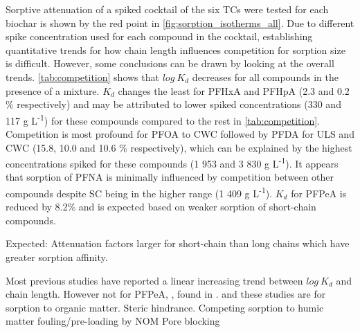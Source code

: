 Sorptive attenuation of a spiked cocktail of the six TCs were tested for each biochar is shown by the red point in \cref{fig:sorption_isotherms_all}. Due to different spike concentration used for each compound in the cocktail, establishing quantitative trends for how chain length influences competition for sorption size is difficult. However, some conclusions can be drawn by looking at the overall trends. \cref{tab:competition} shows that $log~K_d$ decreases for all compounds in the presence of a mixture. $K_d$ changes the least for PFHxA and PFHpA (2.3 and 0.2 \% respectively) and may be attributed to lower spiked concentrations (330 and 117 \textmu g L\textsuperscript{-1}) for these compounds compared to the rest in \cref{tab:competition}. Competition is most profound for PFOA to CWC followed by PFDA for ULS and CWC (15.8, 10.0 and 10.6 \% respectively), which can be explained by the highest concentrations spiked for these compounds (1 953 and 3 830 \textmu g L\textsuperscript{-1}). It appears that sorption of PFNA is minimally influenced by competition between other compounds despite SC being in the higher range (1 409 \textmu g L\textsuperscript{-1}). $K_d$ for PFPeA is reduced by 8.2\% and is expected based on weaker sorption of short-chain compounds.

Expected: Attenuation factors larger for short-chain than long chains which have greater sorption affinity.

Most previous studies have reported a linear increasing trend between $log~K_d$ and chain length. However not for PFPeA, \citep{zhang2013sorption}, found in \citep{Sorengard2019}. and \citep{guelfo2013} these studies are for sorption to organic matter.  Steric hindrance. Competing sorption to humic matter
fouling/pre-loading by NOM
Pore blocking

